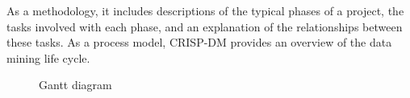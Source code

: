 As a methodology, it includes descriptions of the typical phases of a project, the tasks involved with each phase, and an explanation of the relationships between these tasks.
As a process model, CRISP-DM provides an overview of the data mining life cycle.
\thispagestyle{empty}

\begin{landscape}
	
\begin{figure}
	\noindent
					\vspace*{-2cm}
	\hspace{4.35cm}

	\caption{Gantt diagram}

\end{figure}

\end{landscape}
\restoregeometry